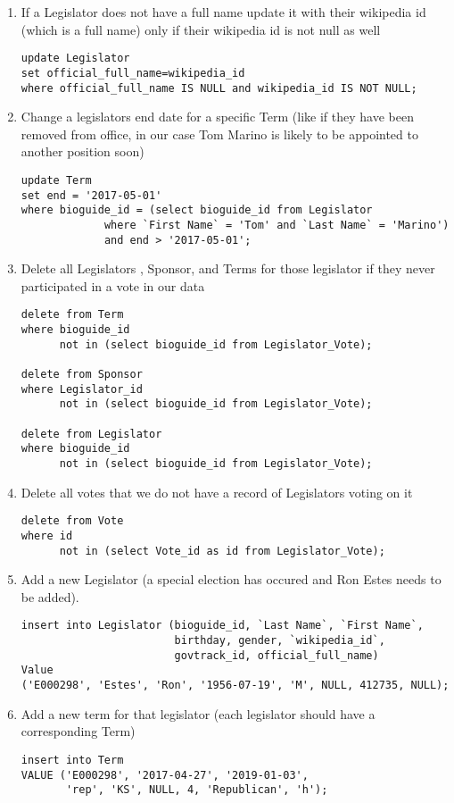 \documentclass[11pt]{article}
\begin{document}
\begin{enumerate}
\item If a Legislator does not have a full name update it with 
their wikipedia id (which is a full name) only if 
their wikipedia id is not null as well
\begin{verbatim}
update Legislator 
set official_full_name=wikipedia_id 
where official_full_name IS NULL and wikipedia_id IS NOT NULL;
\end{verbatim}

\item Change a legislators end date for a specific Term
(like if they have been removed from office, 
 in our case Tom Marino is likely to be appointed to another position soon)
\begin{verbatim}
update Term
set end = '2017-05-01'
where bioguide_id = (select bioguide_id from Legislator 
		     where `First Name` = 'Tom' and `Last Name` = 'Marino') 
		     and end > '2017-05-01';
\end{verbatim}

\item Delete all Legislators , Sponsor, and Terms for those legislator 
if they never participated in a vote in our data
\begin{verbatim}
delete from Term 
where bioguide_id 
      not in (select bioguide_id from Legislator_Vote);

delete from Sponsor 
where Legislator_id 
      not in (select bioguide_id from Legislator_Vote);

delete from Legislator 
where bioguide_id 
      not in (select bioguide_id from Legislator_Vote);
\end{verbatim}

\item Delete all votes that we do not have a record of Legislators voting on it
\begin{verbatim}
delete from Vote 
where id 
      not in (select Vote_id as id from Legislator_Vote);
\end{verbatim}

\item Add a new Legislator (a special election has occured and Ron Estes needs to be added).
\begin{verbatim}
insert into Legislator (bioguide_id, `Last Name`, `First Name`, 
                        birthday, gender, `wikipedia_id`, 
                        govtrack_id, official_full_name)     
Value     
('E000298', 'Estes', 'Ron', '1956-07-19', 'M', NULL, 412735, NULL);
\end{verbatim}

\item Add a new term for that legislator (each legislator should have a corresponding Term)
\begin{verbatim}
insert into Term 
VALUE ('E000298', '2017-04-27', '2019-01-03', 
       'rep', 'KS', NULL, 4, 'Republican', 'h');
\end{verbatim}
\end{enumerate}
\end{document}
